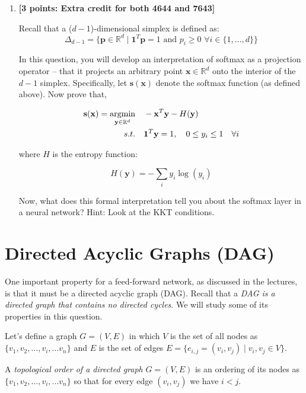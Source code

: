 \documentclass[11pt,english]{article}
\begin{document}
\begin{enumerate}[start]
\item
\textbf{[3 points: Extra credit for both 4644 and 7643]}

Recall that a ($d-1$)-dimensional simplex is defined as: 
\begin{equation}
    \Delta_{d - 1} = \{\mathbf{p} \in \mathbb{R}^{d} \mid \mathbf{1}^{T}\mathbf{p} = 1 \text{ and } p_i \ge 0 \,\, \forall i \in \{1,\ldots,d\} \}
\end{equation}

In this question, you will develop an interpretation of softmax as a projection operator -- that it projects an arbitrary point $\mathbf{x} \in \mathbb{R}^d$ onto the interior of the $d - 1$ simplex. Specifically, let $\mathbf{s}(\mathbf{x})$ denote the softmax function (as defined above). Now prove that, 


\begin{align}
    \mathbf{s}(\mathbf{x}) =  \argmin_{\mathbf{y} \in \mathbb{R}^d} &\quad  -\mathbf{x}^{T}\mathbf{y} - H(\mathbf{y}) \\ 
     \st & \quad \mathbf{1}^{T}\mathbf{y} = 1, \quad 0 \le y_i \le 1 \quad \forall i
\end{align}

where $H$ is the entropy function: 

\begin{equation}
    H(\mathbf{y}) = - \sum_{i}y_{i}\log(y_{i})
\end{equation}

Now, what does this formal interpretation tell you about the softmax layer in a neural network? 
Hint: Look at the KKT conditions.


\end{enumerate}

\section{Directed Acyclic Graphs (DAG)}


One important property for a feed-forward network, as discussed in the lectures, is that it must be a directed acyclic graph (DAG). Recall that a \emph{DAG is a directed graph that contains no directed cycles}. We will study some of its properties in this question.

Let's define a graph $G=(V, E)$ in which $V$ is the set of all nodes as $\{v_1, v_2, ..., v_i, ... v_n\}$ and $E$ is the set of 
edges $E = \big\{e_{i,j} = (v_i, v_j) \mid v_i, v_j \in V \big\}$.

A \emph{topological order of a directed graph} $G=(V, E)$ is an ordering of its nodes as $\{v_1, v_2, ..., v_i, ... v_n\}$ so that for every edge $(v_i, v_j)$ we have $i < j$.
\end{document}
